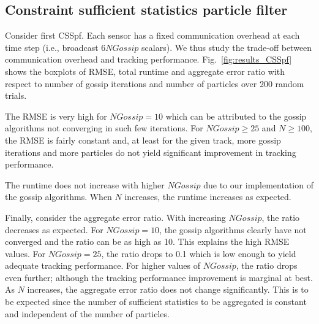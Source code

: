 \documentclass[10pt,letterpaper,final]{article}
\begin{document}
\subsection{Constraint sufficient statistics particle filter}
Consider first CSSpf. Each sensor has a fixed communication overhead at each time step (i.e., broadcast 6$NGossip$ scalars). We thus study the trade-off between communication overhead and tracking performance. Fig.~\ref{fig:results_CSSpf} shows the boxplots of RMSE, total runtime and aggregate error ratio with respect to number of gossip iterations and number of particles over 200 random trials. 

The RMSE is very high for $NGossip=10$ which can be attributed to the gossip algorithms not converging in such few iterations. For $NGossip\geq 25$ and $N\geq 100$, the RMSE is fairly constant and, at least for the given track, more gossip iterations and more particles do not yield significant improvement in tracking performance. 

The runtime does not increase with higher $NGossip$ due to our implementation of the gossip algorithms. When $N$ increases, the runtime increases as expected. 

Finally, consider the aggregate error ratio. With increasing $NGossip$, the ratio decreases as expected. For $NGossip=10$, the gossip algorithms clearly have not converged and the ratio can be as high as 10. This explains the high RMSE values. For $NGossip=25$, the ratio drops to 0.1 which is low enough to yield adequate tracking performance. For higher values of $NGossip$, the ratio drops even further; although the tracking performance improvement is marginal at best. As $N$ increases, the aggregate error ratio does not change significantly. This is to be expected since the number of sufficient statistics to be aggregated is constant and independent of the number of particles. 
\end{document}
